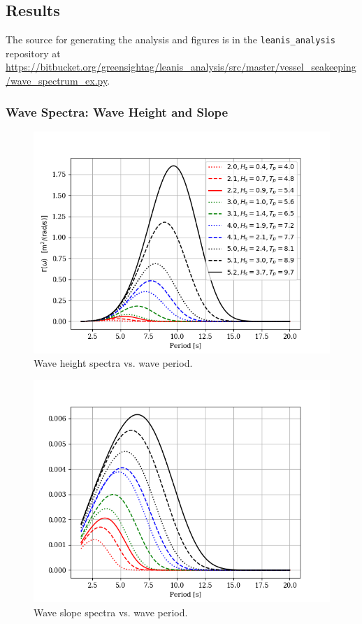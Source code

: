 \documentclass[11pt, letterpaper]{article}
\begin{document}
\subsection{Results}
\newcommand{\RFW}{0.7}

The source for generating the analysis and figures is in the \verb+leanis_analysis+ repository at \url{https://bitbucket.org/greensightag/leanis_analysis/src/master/vessel_seakeeping/wave_spectrum_ex.py}.

\subsubsection{Wave Spectra: Wave Height and Slope}

\begin{figure}[hbt!]
\centering
\includegraphics[width=\RFW\linewidth]{cusv/SvsT.png}
\caption{Wave height spectra vs. wave period.}
\label{f:SvsT}
\end{figure}

\begin{figure}[hbt!]
\centering
\includegraphics[width=\RFW\linewidth]{cusv/slopeVt.png}
\caption{Wave slope spectra vs. wave period.}
\label{f:slopeVt}
\end{figure}
\end{document}
